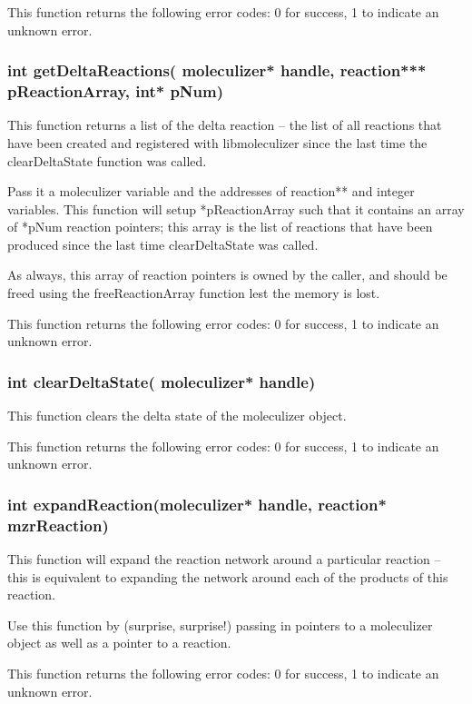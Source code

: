 This function returns the following error codes: 0 for success, 1 to
indicate an unknown error.

\subsubsection{int getDeltaReactions( moleculizer* handle, reaction***
  pReactionArray, int* pNum)}
This function returns a list of the delta reaction -- the list of all
reactions that have been created and registered with libmoleculizer
since the last time the clearDeltaState function was called.

Pass it a moleculizer variable and the addresses of reaction** and
integer variables.  This function will setup *pReactionArray such that
it contains an array of *pNum reaction pointers; this array is the list
of reactions that have been produced since the last time clearDeltaState
was called.

As always, this array of reaction pointers is owned by the caller, and
should be freed using the freeReactionArray function lest the memory is
lost.

This function returns the following error codes: 0 for success, 1 to
indicate an unknown error.

\subsubsection{int clearDeltaState( moleculizer* handle)}
This function clears the delta state of the moleculizer object.  

This function returns the following error codes: 0 for success, 1 to
indicate an unknown error.

\subsubsection{int expandReaction(moleculizer* handle, reaction*
  mzrReaction)}
This function will expand the reaction network around a particular
reaction -- this is equivalent to expanding the network around each of
the products of this reaction.  

Use this function by (surprise, surprise!) passing in pointers to a
moleculizer object as well as a pointer to a reaction.  

This function returns the following error codes: 0 for success, 1 to
indicate an unknown error.

